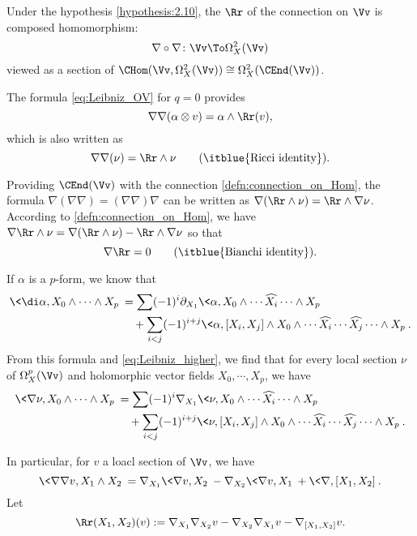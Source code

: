 \begin{definition}\label{defn:curvature-explicit}
  Under the hypothesis \ref{hypothesis:2.10}, the  $\Rr$ of
  the connection on $\Vv$ is composed homomorphism:
  \[
  \nabla\circ\nabla\colon\Vv\To\Omega_X^2(\Vv)
  \]
  viewed as a section of
  $\CHom(\Vv,\Omega_X^2(\Vv))\cong\Omega_X^2(\CEnd(\Vv))$.
\end{definition}

\begin{para}
  The formula \cref{eq:Leibniz_OV} for $q=0$ provides
  \begin{equation}
    \nabla\nabla(\alpha\otimes v) = \alpha\wedge\Rr(v),
  \end{equation}
  which is also written as
  \begin{equation}\label{eq:Ricci}
    \nabla\nabla(\nu)=\Rr\wedge\nu\qquad\text{(\itblue{Ricci identity})}.
  \end{equation}

  Providing $\CEnd(\Vv)$ with the connection \ref{defn:connection_on_Hom},
  the formula $\nabla(\nabla\nabla)=(\nabla\nabla)\nabla$ can be written as
  $\nabla(\Rr\wedge\nu)=\Rr\wedge\nabla\nu$.
  According to \ref{defn:connection_on_Hom}, we have
  $\nabla\Rr\wedge\nu = \nabla(\Rr\wedge\nu) - \Rr\wedge\nabla\nu$ so that
  \begin{equation}\label{eq:Bianchi}
    \nabla\Rr = 0\qquad\text{(\itblue{Bianchi identity})}.
  \end{equation}
\end{para}

\begin{para}\label{defn:curvature}
  If $\alpha$ is a $p$-form, we know that
  \begin{align*}
    \<\di\alpha,X_0\wedge\cdots\wedge X_p\> &=
    \sum (-1)^i\partial_{X_1}
    \<\alpha,X_0\wedge\cdots\widehat{X_i}\cdots\wedge X_p\> \\
    &\quad+
    \sum_{i<j}(-1)^{i+j}\<\alpha,[X_i,X_j]\wedge X_0
    \wedge\cdots\widehat{X_i}\cdots\widehat{X_j}\cdots\wedge X_p\>.
  \end{align*}
  From this formula and \cref{eq:Leibniz_higher}, we find that for every local
  section $\nu$ of $\Omega_X^p(\Vv)$ and holomorphic vector fields
  $X_0,\cdots,X_p$, we have
  \begin{align*}
    \<\nabla\nu,X_0\wedge\cdots\wedge X_p\> &=
    \sum (-1)^i\nabla_{X_1}
    \<\nu,X_0\wedge\cdots\widehat{X_i}\cdots\wedge X_p\> \\
    &\quad+
    \sum_{i<j}(-1)^{i+j}\<\nu,[X_i,X_j]\wedge X_0
    \wedge\cdots\widehat{X_i}\cdots\widehat{X_j}\cdots\wedge X_p\>.
  \end{align*}

  In particular, for $v$ a loacl section of $\Vv$, we have
  \[
  \<\nabla\nabla v, X_1\wedge X_2\> =
  \nabla_{X_1}\<\nabla v,X_2\> - \nabla_{X_2}\<\nabla v,X_1\> +
  \<\nabla,[X_1,X_2]\>.
  \]
  Let
  \[
  \Rr(X_1,X_2)(v):=
  \nabla_{X_1}\nabla_{X_2}v-\nabla_{X_2}\nabla_{X_1}v
  -\nabla_{[X_1,X_2]}v.
  \]
\end{para}

